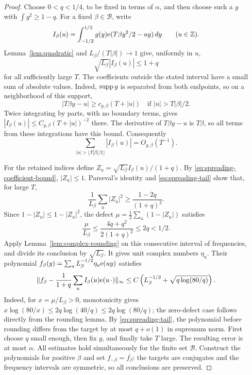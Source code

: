\begin{proof}
Choose $0<q<1/4$, to be fixed in terms of $\alpha$, and then
choose such a $g$ with $\int g^2\ge1-q$.
For a fixed $\beta\in\mathcal B$, write
\[
 I_\beta(u)=\int_{-1/2}^{1/2}g(y)\mathrm e(T\beta y^2/2-uy)\,dy
 \qquad(u\in\mathbb Z).
\]
Lemma~\ref{lem:quadratic} and $L_\beta/(T|\beta|)\to1$ give, uniformly
in $u$,
\begin{equation}\label{eq:spreading-coefficient-bound}
 \sqrt{L_\beta}|I_\beta(u)|\le1+q
\end{equation}
for all sufficiently large $T$.
The coefficients outside the stated interval have a small sum of
absolute values.  Indeed, $\operatorname{supp} g$ is separated from both endpoints,
so on a neighborhood of this support,
\[
 |T\beta y-u|\ge c_{g,\beta}(T+|u|)
 \quad\text{if }|u|>T|\beta|/2.
\]
Twice integrating by parts, with no boundary terms, gives
$|I_\beta(u)|\le C_{g,\beta}(T+|u|)^{-2}$ there.  The derivative of
$T\beta y-u$ is $T\beta$, so all terms from these integrations have
this bound.  Consequently
\begin{equation}\label{eq:spreading-tail}
 \sum_{|u|>\lfloor T|\beta|/2\rfloor}|I_\beta(u)|=O_{g,\beta}(T^{-1}).
\end{equation}

For the retained indices define
$Z_u=\sqrt{L_\beta}I_\beta(u)/(1+q)$.
By \eqref{eq:spreading-coefficient-bound}, $|Z_u|\le1$.
Parseval's identity and \eqref{eq:spreading-tail} show that, for large $T$,
\[
 \frac1{L_\beta}\sum_u|Z_u|^2\ge\frac{1-2q}{(1+q)^2}.
\]
Since $1-|Z_u|\le1-|Z_u|^2$, the defect
$\mu=\frac12\sum_u(1-|Z_u|)$ satisfies
\[
 \frac{\mu}{L_\beta}\le\frac{4q+q^2}{2(1+q)^2}\le2q<1/2.
\]
Apply Lemma~\ref{lem:complex-rounding} on this consecutive interval of
frequencies, and divide its conclusion by $\sqrt{L_\beta}$.  It gives
unit complex numbers $\eta_u$.  Their polynomial
$f_\beta(y)=\sum_u L_\beta^{-1/2}\eta_u\mathrm e(uy)$ satisfies
\[
 \lVert f_\beta-\frac1{1+q}\sum_u I_\beta(u)\mathrm e(u\,\cdot)\rVert_\infty
 \le C\left(L_\beta^{-1/2}+\sqrt{q\log(80/q)}\right).
\]
Indeed, for $x=\mu/L_\beta>0$, monotonicity gives
$x\log(80/x)\le2q\log(40/q)\le2q\log(80/q)$; the zero-defect
case follows directly from the rounding lemma.  By \eqref{eq:spreading-tail}, the polynomial before rounding
differs from the target by at most $q+o(1)$ in supremum norm.
First choose $q$ small enough, then fix $g$, and finally take $T$ large.
The resulting error is at most $\alpha$.
All estimates hold simultaneously for the finite set $\mathcal B$.
Construct the polynomials for positive $\beta$ and set
$f_{-\beta}=\overline{f_\beta}$: the targets are conjugates and the
frequency intervals are symmetric, so all conclusions are preserved.
\end{proof}

